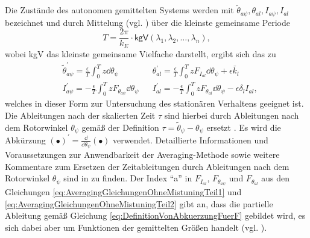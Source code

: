 %
%
%
Die Zustände des autonomen gemittelten Systems werden mit $\tilde{\theta}_{a \psi}, \theta_{al}, I_{a \psi}, I_{al}$ bezeichnet 
und durch Mittelung (vgl. ) über die kleinste gemeinsame Periode
\begin{equation}
	T = \frac{2 \pi}{k_E}	\cdot	\textsf{kgV} (\lambda_1, \lambda_2, \dots, \lambda_n),
	\label{eq:DefinitionVonPeriodeUeberWelcheGeaveragedWird}
\end{equation}
wobei \textsf{kgV} das kleinste gemeinsame Vielfache darstellt,
%
%
%
ergibt sich das  zu 
%
\begin{align}
		& \tilde{\theta}_{a \psi}^\prime = \frac{\epsilon}{T} \int_0^T   z \dd \theta_{\psi}  &  
		& \theta_{al}^\prime = \frac{\epsilon}{T} \int_0^T     z F_{I_{al}}    \dd \theta_{\psi}        + \epsilon \bar{k}_l  	\label{eq:AveragingGleichungenOhneMistuningTeil1}\\
		& I_{a \psi}^\prime = - \frac{\epsilon}{T} \int_0^T  z F_{\theta_{a\psi}}    \dd \theta_{\psi}  %
																																											 &
		& I_{al}^\prime = - \frac{\epsilon}{T} \int_0^T   z F_{\theta_{al}}     \dd \theta_{\psi}        - \epsilon \delta_l I_{al},
	\label{eq:AveragingGleichungenOhneMistuningTeil2}
\end{align}
welches in dieser Form zur Untersuchung des stationären Verhaltens geeignet ist.
Die Ableitungen nach der skalierten Zeit $\tau$ sind hierbei durch Ableitungen nach 
dem Rotorwinkel $\theta_{\psi}$ 
gemäß der Definition $\tau = \tilde{\theta}_{\psi} - \theta_{\psi}$ ersetzt \cite{Mayet:Tautochronic}.
Es wird die Abkürzung ${\left(\bullet\right)}^\prime =\frac{\dd}{\dd{\theta_{\psi}}}\left(\bullet\right)$ verwendet.
Detaillierte Informationen und Voraussetzungen zur Anwendbarkeit der Averaging-Methode sowie 
weitere Kommentare  zum Ersetzen der Zeitableitungen durch Ableitungen nach dem Rotorwinkel $\theta_{\psi}$  sind in \cite{Mayet:Tautochronic} zu finden.
%
%
%
Der Index "`a"' in $F_{I_{al}} $, $F_{\theta_{a\psi}}$ und $F_{\theta_{al}}$
aus den Gleichungen \eqref{eq:AveragingGleichungenOhneMistuningTeil1} und  	\eqref{eq:AveragingGleichungenOhneMistuningTeil2} 
gibt an, dass die partielle Ableitung gemäß Gleichung 	\eqref{eq:DefinitionVonAbkuerzungFuerF} gebildet wird, 
es sich dabei aber um Funktionen der gemittelten Größen handelt (vgl. ).
 


